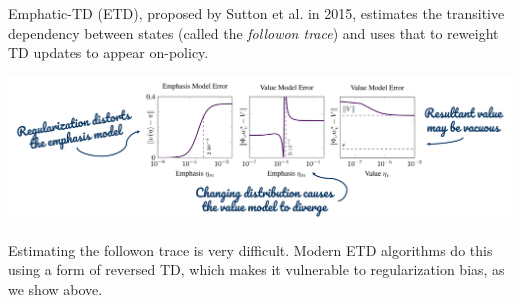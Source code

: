 Emphatic-TD (ETD), proposed by Sutton et al. in 2015, estimates the transitive dependency between states (called the \emph{followon trace}) and uses that to reweight TD updates to appear on-policy.
\vspace{-.11in}
\begin{center}
    \includegraphics[scale=0.4]{parts/emphatic/emphatic.png}
\end{center}
\vspace{-.11in}
Estimating the followon trace is very difficult. Modern ETD algorithms do this using a form of reversed TD, which makes it vulnerable to regularization bias, as we show above.
\vspace{-.3in}
